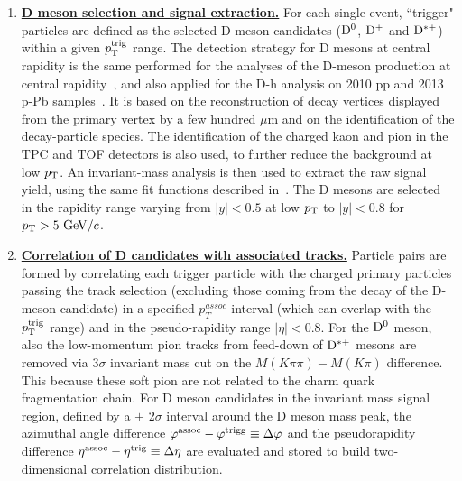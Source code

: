 \begin{enumerate}
\item
\underline {\bf D meson selection and signal extraction.}  For each single event, ``trigger" particles
are defined as the selected  D meson candidates (${\rm D^0}$, ${\rm D^+}$ and ${\rm D^{*+}}$)
within a given $p_{\rm T}^{\rm trig}$ range. The detection strategy for D mesons at central rapidity is
the same performed for the analyses of the D-meson production at central rapidity~\cite{ALICEDmespp7Tev}, and also applied for the D-h analysis on 2010 pp and 2013 p-Pb samples~\cite{ALICEDhcorr}. It is based on the reconstruction of decay
vertices displayed from the primary vertex by a few hundred $\mu$m and on the identification of the decay-particle species.
The identification of the charged kaon and pion in the TPC and TOF
detectors is also used, to further reduce the background at low $p_{\rm T}$.  An
invariant-mass analysis is then used to extract the raw signal yield, using
the same fit functions described in~\cite{ALICEDhcorr}.
The D mesons are selected in the rapidity range varying from $|y|<0.5$ at low $p_{\rm T}$ to $|y|<0.8$ for $p_{\rm T}>5~\mathrm{GeV}/c$. %

\item
\underline{\bf Correlation of D candidates with associated tracks.}
Particle pairs are formed by correlating each trigger particle with
the charged primary particles passing the track selection (excluding those coming from the decay of the D-meson candidate) in a specified $p^{assoc}_{T}$
interval (which can overlap with the $p_{\rm T}^{\rm trig}$ range) and in the pseudo-rapidity range $|\eta|<0.8$. For the ${\rm D^0}$ meson, also the low-momentum pion tracks from feed-down of ${\rm D^{*+}}$ mesons are removed via 3$\sigma$ invariant mass cut on the $M(K\pi\pi)-M(K\pi)$ difference. This because these soft pion are not related to the charm quark fragmentation chain.
For D meson candidates in the invariant mass signal region, defined by a $\pm$ 2$\sigma$ interval around the D meson mass peak, the azimuthal angle difference $\varphi^{\rm assoc}-\varphi^{\rm trigg}\equiv\Delta\varphi$
and the pseudorapidity difference $\eta^{\rm assoc}-\eta^{\rm trig}\equiv\Delta \eta$ are evaluated and stored to build two-dimensional correlation distribution. %


\end{enumerate}
